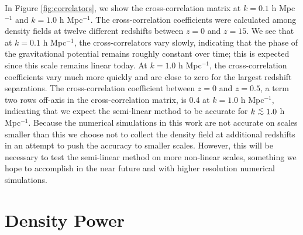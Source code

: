 \documentclass{aastex}
\def\ltsima{$\; \buildrel < \over \sim \;$}
\def\lsim{\lower.5ex\hbox{\ltsima}}
\begin{document}
In Figure \ref{fig:correlators}, we show the cross-correlation matrix
at $k=0.1$ h Mpc$^{-1}$ and $k=1.0$ h Mpc$^{-1}$.  The
cross-correlation coefficients were calculated among density fields at
twelve different redshifts between $z=0$ and $z=15$.
We see that at
$k=0.1$ h Mpc$^{-1}$, the cross-correlators vary slowly,
indicating that the phase of the gravitational potential remains
roughly constant over time; this is expected since this scale
remains linear today.  At $k=1.0$ h Mpc$^{-1}$, the
cross-correlation coefficients vary much more quickly and are
close to zero for the largest redshift separations.  The cross-correlation coefficient between $z=0$ and $z=0.5$, a term
two rows off-axis in the cross-correlation matrix, is 0.4 at $k=1.0$
h Mpc$^{-1}$, indicating
that we expect the semi-linear method to be
accurate for $k \lsim 1.0$ h Mpc$^{-1}$.  Because the numerical
simulations in this work
are not accurate on scales smaller than this we choose not to 
collect the density field at
additional redshifts in an attempt to push the accuracy to smaller
scales.  However, this will be necessary to test 
the semi-linear method on more non-linear scales, something we hope to accomplish
in the near future and with higher resolution numerical simulations.





\section{Density Power}
\label{sec:Density}
\end{document}
